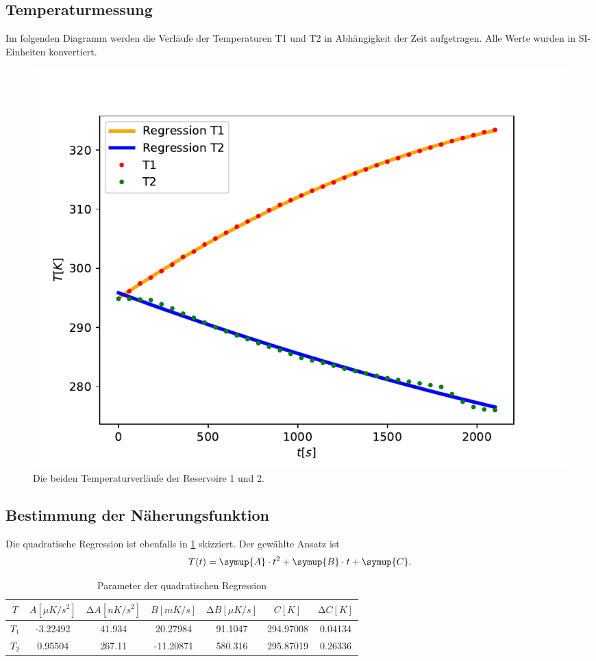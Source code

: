 \subsection{Temperaturmessung}
Im folgenden Diagramm werden die Verläufe der Temperaturen T1 und T2 in Abhängigkeit der Zeit aufgetragen.
Alle Werte wurden in SI-Einheiten konvertiert.
\begin{figure}
  \centering
  \includegraphics[scale = 0.75]{Temperaturverlaeufe.pdf}
  \caption{Die beiden Temperaturverläufe der Reservoire 1 und 2.}
  \label{fig:TemperaturverlaufA}
\end{figure}

\subsection{Bestimmung der Näherungsfunktion}
Die quadratische Regression ist ebenfalls in \ref{fig:TemperaturverlaufA} skizziert. Der gewählte Ansatz ist
\begin{equation}
  T(t) = \symup{A} \cdot t^2 + \symup{B} \cdot t + \symup{C}.
  \label{eq:Regressionsgleichung}
\end{equation}
\begin{table}
  \centering
  \caption{Parameter der quadratischen Regression}
  \label{tab:regression1}
  \begin{tabular}{c S S S S S S}
    \toprule
     {$T$} & {$A [\mu K/s^2]$} & {$\increment A [nK/s^2]$} & {$B [mK/s]$} & {$\increment B [\mu K/s]$} & {$C [K]$} & {$\increment C [K]$} \\
    \midrule
    {$T_\text{1}$} & -3.22492 &  41.934 &  20.27984 & 91.1047 & 294.97008 & 0.04134 \\
    {$T_\text{2}$} & 0.95504 &  267.11 & -11.20871 & 580.316 & 295.87019 & 0.26336 \\
    \bottomrule
  \end{tabular}
\end{table}

